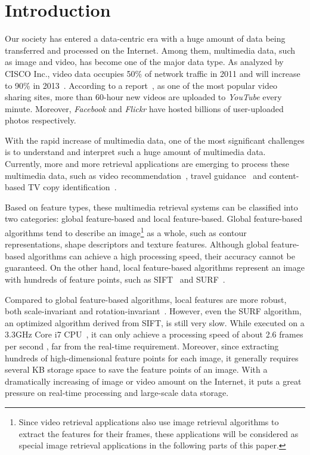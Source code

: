 \section{Introduction}
\label{sec:introduction}

Our society has entered a data-centric era with a huge amount of data being transferred and processed on the Internet. Among them, multimedia data, such as image and video, has become one of the major data type. As analyzed by CISCO Inc., video data occupies 50\% of network traffic in 2011 and will increase to 90\% in 2013~\cite{index2010forecast}.  According to a report~\cite{jansohn2009detecting}, as one of the most popular video sharing sites, more than 60-hour new videos are uploaded to \emph{YouTube} every minute. Moreover, \emph{Facebook} and \emph{Flickr} have hosted billions of user-uploaded photos respectively.

With the rapid increase of multimedia data, one of the most significant challenges is to understand and interpret such a huge amount of multimedia data. Currently, more and more retrieval applications are emerging to process these multimedia data, such as video recommendation~\cite{videorecommendation2007}, travel guidance~\cite{travelguidance2010} and content-based TV copy identification~\cite{tvidentify2003}. 

Based on feature types, these multimedia retrieval systems can be classified into two categories: global feature-based and local feature-based. Global feature-based algorithms tend to describe an image\footnote{Since video retrieval applications also use image retrieval algorithms to extract the features for their frames, these applications will be considered as special image retrieval applications in the following parts of this paper.} as a whole, such as contour representations, shape descriptors and texture features. Although global feature-based algorithms can achieve a high processing speed, their accuracy cannot be guaranteed. On the other hand, local feature-based algorithms represent  an image with hundreds of feature points, such as SIFT~\cite{lowe1999object,lowe2004distinctive} and SURF~\cite{Bay2006SURF,Evans20009OpenSURF}. 

Compared to global feature-based algorithms, local features are more robust, both scale-invariant and rotation-invariant~\cite{mikolajczyk2005performance}\cite{Bauer2007Evaluation}. However, even the SURF algorithm, an optimized algorithm derived from SIFT, is still very slow. While executed on a 3.3GHz Core i7 CPU~\cite{Fang2011ispass}, it can only achieve a processing speed of  about 2.6 frames per second , far from the real-time requirement. Moreover, since extracting hundreds of high-dimensional feature points for each image, it generally requires several KB storage space to save the feature points of an image. With a dramatically increasing of image or video amount on the Internet, it puts a great pressure on real-time processing and large-scale data storage.

